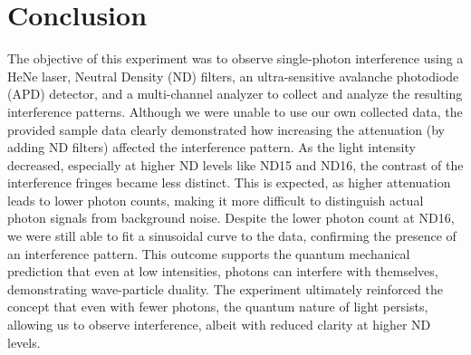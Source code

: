\documentclass{article}
\numberwithin{equation}{section}
\begin{document}
\section{Conclusion}
The objective of this experiment was to observe single-photon interference using a HeNe laser, Neutral Density (ND) filters, an ultra-sensitive avalanche photodiode (APD) detector, and a multi-channel analyzer to collect and analyze the resulting interference patterns. Although we were unable to use our own collected data, the provided sample data clearly demonstrated how increasing the attenuation (by adding ND filters) affected the interference pattern. As the light intensity decreased, especially at higher ND levels like ND15 and ND16, the contrast of the interference fringes became less distinct. This is expected, as higher attenuation leads to lower photon counts, making it more difficult to distinguish actual photon signals from background noise.
Despite the lower photon count at ND16, we were still able to fit a sinusoidal curve to the data, confirming the presence of an interference pattern. This outcome supports the quantum mechanical prediction that even at low intensities, photons can interfere with themselves, demonstrating wave-particle duality. The experiment ultimately reinforced the concept that even with fewer photons, the quantum nature of light persists, allowing us to observe interference, albeit with reduced clarity at higher ND levels.
\end{document}

